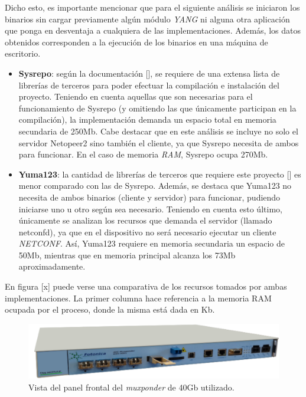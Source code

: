 \begin{itemize}
	Dicho esto, es importante mencionar que para el siguiente análisis se iniciaron los binarios sin cargar previamente algún módulo \textit{YANG} ni alguna otra aplicación que ponga en desventaja a cualquiera de las implementaciones. Además, los datos obtenidos corresponden a la ejecución de los binarios en una máquina de escritorio.

	\begin{itemize}
		\item \textbf{Sysrepo}: según la documentación [], se requiere de una extensa lista de librerías de terceros para poder efectuar la compilación e instalación del proyecto. Teniendo en cuenta aquellas que son necesarias para el funcionamiento de Sysrepo (y omitiendo las que únicamente participan en la compilación), la implementación demanda un espacio total en memoria secundaria de 250Mb. Cabe destacar que en este análisis se incluye no solo el servidor Netopeer2 sino también el cliente, ya que Sysrepo necesita de ambos para funcionar. En el caso de memoria \textit{RAM}, Sysrepo ocupa 270Mb.

		\item \textbf{Yuma123}: la cantidad de librerías de terceros que requiere este proyecto [] es menor comparado con las de Sysrepo. Además, se destaca que Yuma123 no necesita de ambos binarios (cliente y servidor) para funcionar, pudiendo iniciarse uno u otro según sea necesario. Teniendo en cuenta esto último, únicamente se analizan los recursos que demanda el servidor (llamado netconfd), ya que en el dispositivo no será necesario ejecutar un cliente \textit{NETCONF}. Así, Yuma123 requiere en memoria secundaria un espacio de 50Mb, mientras que en memoria principal alcanza los 73Mb aproximadamente.

	\end{itemize}
	
	En figura [x] puede verse una comparativa de los recursos tomados por ambas implementaciones. La primer columna hace referencia a la memoria RAM ocupada por el proceso, donde la misma está dada en Kb.

	\begin{figure}[H]
		\centering
		\includegraphics[scale=0.9]{Figures/mux40.pdf}
		\caption{Vista del panel frontal del \textit{muxponder} de 40Gb utilizado.}
		\label{fig:consumoagentes}
	  \end{figure}
	\end{itemize}


